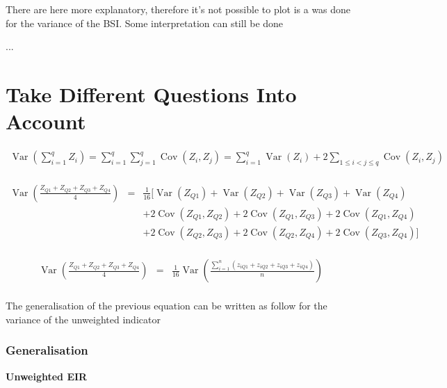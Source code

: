 \documentclass[12pt,a4paper,oneside]{book}
\DeclareMathOperator{\Var}{Var}
\DeclareMathOperator{\Cov}{Cov}
\begin{document}
 
There are here more explanatory, therefore it's not possible to plot is a was done for the variance of the BSI. Some interpretation can still be done

...

\section{Take Different Questions Into Account}



\begin{eqnarray}
\Var \left(\sum_{i=1}^{q} Z_{i}\right) = \sum_{i=1}^{q} \sum_{j=1}^{q} \Cov\left(Z_{i}, Z_{j}\right)
= \sum_{i=1}^{q} \Var\left(Z_{i}\right)+2 \sum_{1 \leq i<j \leq q} \Cov\left(Z_{i}, Z_{j}\right) \\ \nonumber
\end{eqnarray} 



\begin{eqnarray}
    \Var \left(\frac{Z_{Q1} + Z_{Q2} + Z_{Q3} + Z_{Q4}}{4} \right) 
    &=& \frac{1}{16} \Big[ \Var(Z_{Q1}) + \Var(Z_{Q2}) + \Var(Z_{Q3}) + \Var(Z_{Q4}) \nonumber \\
    && + 2 \Cov (Z_{Q1},Z_{Q2}) + 2 \Cov (Z_{Q1},Z_{Q3}) + 2 \Cov (Z_{Q1},Z_{Q4}) \nonumber \\
    &&  + 2 \Cov (Z_{Q2},Z_{Q3}) + 2 \Cov (Z_{Q2},Z_{Q4}) + 2 \Cov (Z_{Q3},Z_{Q4}) \Big] \nonumber \\
\end{eqnarray}



\begin{eqnarray}
    \Var \left(\frac{Z_{Q1} + Z_{Q2} + Z_{Q3} + Z_{Q4}}{4} \right) 
    &=& \frac{1}{16} \Var \left(\frac{\sum_{i=1}^n \left(z_{i Q1} + z_{i Q2} + z_{i Q3} + z_{i Q4} \right)}{n} \right) \nonumber \\
\end{eqnarray}

The generalisation of the previous equation can be written as follow for the variance of the unweighted indicator


\subsubsection{Generalisation}

\textbf{Unweighted EIR}
\end{document}
